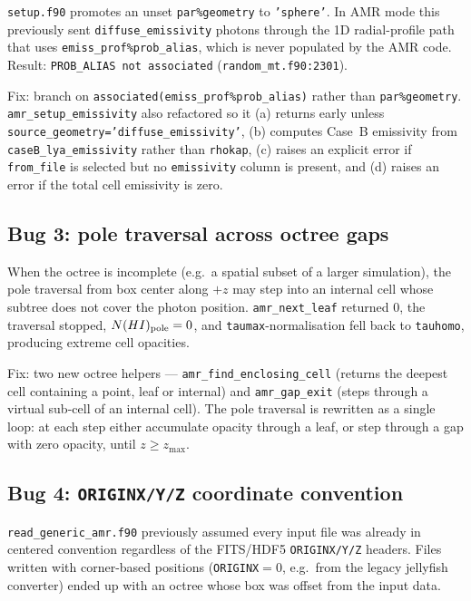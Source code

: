 \documentclass[english,a4paper]{my_memo}
\begin{document}
\texttt{setup.f90} promotes an unset \texttt{par\%geometry} to
\texttt{'sphere'}.  In AMR mode this previously sent
\texttt{diffuse\_emissivity} photons through the 1D radial-profile path
that uses \texttt{emiss\_prof\%prob\_alias}, which is never populated by
the AMR code.  Result: \texttt{PROB\_ALIAS not associated}
(\texttt{random\_mt.f90:2301}).

Fix: branch on \texttt{associated(emiss\_prof\%prob\_alias)} rather than
\texttt{par\%geometry}.  \texttt{amr\_setup\_emissivity} also refactored
so it (a) returns early unless
\texttt{source\_geometry='diffuse\_emissivity'}, (b) computes Case~B
emissivity from \texttt{caseB\_lya\_emissivity} rather than
\texttt{rhokap}, (c) raises an explicit error if \texttt{from\_file} is
selected but no \texttt{emissivity} column is present, and (d) raises
an error if the total cell emissivity is zero.

\subsection{Bug 3: pole traversal across octree gaps}

When the octree is incomplete (e.g.\ a spatial subset of a larger
simulation), the pole traversal from box center along $+z$ may step
into an internal cell whose subtree does not cover the photon
position.  \texttt{amr\_next\_leaf} returned 0, the traversal stopped,
$N(HI)_{\rm pole}=0$, and \texttt{taumax}-normalisation fell back to
\texttt{tauhomo}, producing extreme cell opacities.

Fix: two new octree helpers --- \texttt{amr\_find\_enclosing\_cell}
(returns the deepest cell containing a point, leaf or internal) and
\texttt{amr\_gap\_exit} (steps through a virtual sub-cell of an
internal cell).  The pole traversal is rewritten as a single loop:
at each step either accumulate opacity through a leaf, or step
through a gap with zero opacity, until $z\ge z_{\max}$.

\subsection{Bug 4: \texttt{ORIGINX/Y/Z} coordinate convention}

\texttt{read\_generic\_amr.f90} previously assumed every input file
was already in centered convention regardless of the FITS/HDF5
\texttt{ORIGINX/Y/Z} headers.  Files written with corner-based
positions (\texttt{ORIGINX}$=0$, e.g.\ from the legacy jellyfish
converter) ended up with an octree whose box was offset from the
input data.
\end{document}
